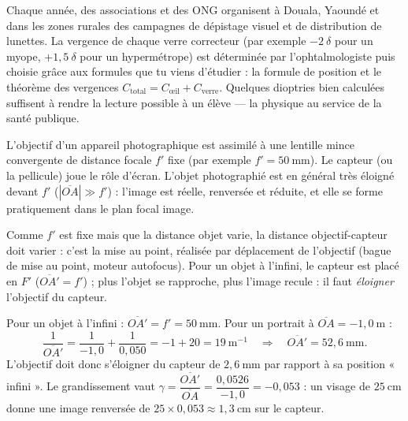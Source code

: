 \documentclass[11pt]{article}
\newcommand{\cle}[1]{{\popxbold\color{popdark}#1}}
\newcounter{popsec}
\newcounter{popsub}
\newcommand{\courssub}[1]{%
  \stepcounter{popsub}%
  \par\vspace{9pt}\noindent{\popxbold\fontsize{11.5}{13}\selectfont\color{popink}{\color{poporange}\thepopsec.\thepopsub}\hspace{6pt}#1}\par\nopagebreak\vspace{4pt}
}
\begin{document}
\begin{savaistu}
Chaque année, des associations et des ONG organisent à Douala, Yaoundé et dans les zones rurales des campagnes de dépistage visuel et de distribution de lunettes. La vergence de chaque verre correcteur (par exemple $-2\ \delta$ pour un myope, $+1{,}5\ \delta$ pour un hypermétrope) est déterminée par l'ophtalmologiste puis choisie grâce aux formules que tu viens d'étudier : la formule de position et le théorème des vergences $C_{\text{total}} = C_{\text{œil}} + C_{\text{verre}}$. Quelques dioptries bien calculées suffisent à rendre la lecture possible à un élève — la physique au service de la santé publique.
\end{savaistu}

\courssub{L'appareil photographique}

\begin{definition}
L'\cle{objectif} d'un appareil photographique est assimilé à une lentille mince convergente de distance focale $f'$ fixe (par exemple $f' = 50\ \text{mm}$). Le \cle{capteur} (ou la pellicule) joue le rôle d'écran. L'objet photographié est en général très éloigné devant $f'$ ($|\overline{OA}| \gg f'$) : l'image est \cle{réelle}, \cle{renversée} et \cle{réduite}, et elle se forme pratiquement dans le plan focal image.
\end{definition}

Comme $f'$ est fixe mais que la distance objet varie, la distance objectif-capteur doit varier : c'est la \cle{mise au point}, réalisée par déplacement de l'objectif (bague de mise au point, moteur autofocus). Pour un objet à l'infini, le capteur est placé en $F'$ ($\overline{OA'} = f'$) ; plus l'objet se rapproche, plus l'image recule : il faut \emph{éloigner} l'objectif du capteur.

\begin{exemplebox}
Pour un objet à l'infini : $\overline{OA'} = f' = 50\ \text{mm}$. Pour un portrait à $\overline{OA} = -1{,}0\ \text{m}$ :
\[ \frac{1}{\overline{OA'}} = \frac{1}{-1{,}0} + \frac{1}{0{,}050} = -1 + 20 = 19\ \text{m}^{-1} \quad\Rightarrow\quad \overline{OA'} = 52{,}6\ \text{mm}. \]
L'objectif doit donc s'éloigner du capteur de $2{,}6\ \text{mm}$ par rapport à sa position « infini ». Le grandissement vaut $\gamma = \dfrac{\overline{OA'}}{\overline{OA}} = \dfrac{0{,}0526}{-1{,}0} = -0{,}053$ : un visage de $25\ \text{cm}$ donne une image renversée de $25 \times 0{,}053 \approx 1{,}3\ \text{cm}$ sur le capteur.
\end{exemplebox}
\end{document}
